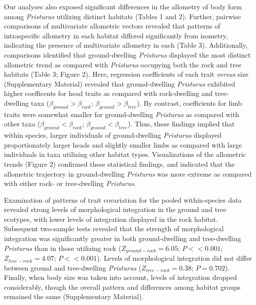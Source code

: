 \documentclass[
  11pt,
]{article}
\begin{document}
Our analyses also exposed significant differences in the allometry of
body form among \emph{Pristurus} utilizing distinct habitats (Tables 1
and 2). Further, pairwise comparisons of multivariate allometric vectors
revealed that patterns of intraspecific allometry in each habitat
differed significantly from isometry, indicating the presence of
multivariate allometry in each (Table 3). Additionally, comparisons
identified that ground-dwelling \emph{Pristurus} displayed the most
distinct allometric trend as compared with \emph{Pristurus} occupying
both the rock and tree habitats (Table 3; Figure 2). Here, regression
coefficients of each trait \emph{versus} size (Supplementary Material)
revealed that ground-dwelling \emph{Pristurus} exhibited higher
coefficents for head traits as compared with rock-dwelling and
tree-dwelling taxa (\(\beta_{ground}>\beta_{rock}\);
\(\beta_{ground}>\beta_{tree}\)). By contrast, coefficients for limb
traits were somewhat smaller for ground-dwelling \emph{Pristurus} as
compared with other taxa (\(\beta_{ground}<\beta_{rock}\);
\(\beta_{ground}<\beta_{tree}\)). Thus, these findings implied that
within species, larger individuals of ground-dwelling \emph{Pristurus}
displayed proportionately larger heads and slightly smaller limbs as
compared with large individuals in taxa utilizing other habitat types.
Visualizations of the allometric trends (Figure 2) confirmed these
statistical findings, and indicated that the allometric trajectory in
ground-dwelling \emph{Pristurus} was more extreme as compared with
either rock- or tree-dwelling \emph{Pristurus}. \hfill\break

Examination of patterns of trait covariation for the pooled
within-species data revealed strong levels of morphological integration
in the ground and tree ecotypes, with lower levels of integration
displayed in the rock habitat. Subsequent two-sample tests revealed that
the strength of morphological integration was significantly greater in
both ground-dwelling and tree-dwelling \emph{Pristurus} than in those
utilizing rock (\(Z_{ground-rock}=6.05\); \(P << 0.001\);
\(Z_{tree-rock}=4.07\); \(P << 0.001\)). Levels of morphological
integration did not differ between ground and tree-dwelling
\emph{Pristurus} (\(Z_{tree-rock}=0.38\); \(P = 0.702\)). Finally, when
body size was taken into account, levels of integration dropped
considerably, though the overall pattern and differences among habitat
groups remained the same (Supplementary Material). \hfill\break
\end{document}
